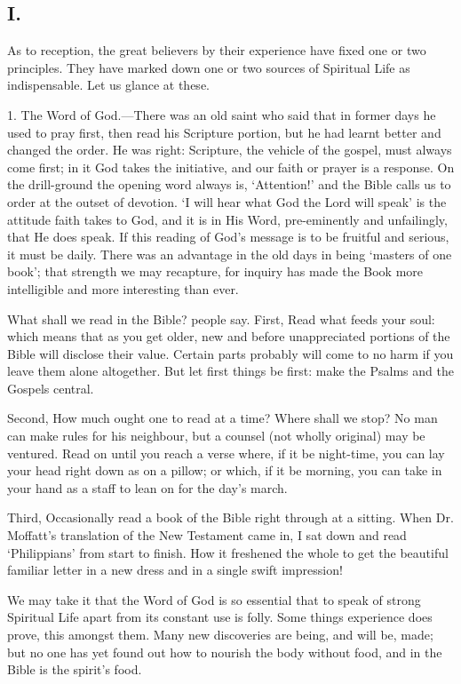\documentclass[12pt,a5paper]{article}
\begin{document}
\subsection*{I.}

As to reception, the great believers by their experience have fixed one or two principles. They have marked down one or two sources of Spiritual Life as indispensable. Let us glance at these.

1. The Word of God.---There was an old saint who said that in former days he used to pray first, then read his Scripture portion, but he had learnt better and changed the order. He was right: Scripture, the vehicle of the gospel, must always come first; in it God takes the initiative, and our faith or prayer is a response. On the drill-ground the opening word always is, `Attention!' and the Bible calls us to order at the outset of devotion. `I will hear what God the Lord will speak' is the attitude faith takes to God, and it is in His Word, pre-eminently and unfailingly, that He does speak. If this reading of God's message is to be fruitful and serious, it must be daily. There was an advantage in the old days in being `masters of one book'; that strength we may recapture, for inquiry has made the Book more intelligible and more interesting than ever. 

What shall we read in the Bible? people say. First, Read what feeds your soul: which means that as you get older, new and before unappreciated portions of the Bible will disclose their value. Certain parts probably will come to no harm if you leave them alone altogether. But let first things be first: make the Psalms and the Gospels central. 

Second, How much ought one to read at a time? Where shall we stop? No man can make rules for his neighbour, but a counsel (not wholly original) may be ventured. Read on until you reach a verse where, if it be night-time, you can lay your head right down as on a pillow; or which, if it be morning, you can take in your hand as a staff to lean on for the day's march. 

Third, Occasionally read a book of the Bible right through at a sitting. When Dr. Moffatt's translation of the New Testament came in, I sat down and read `Philippians' from start to finish. How it freshened the whole to get the beautiful familiar letter in a new dress and in a single swift impression!  

We may take it that the Word of God is so essential that to speak of strong Spiritual Life apart from its constant use is folly. Some things experience does prove, this amongst them. Many new discoveries are being, and will be, made; but no one has yet found out how to nourish the body without food, and in the Bible is the spirit's food. 
\end{document}
